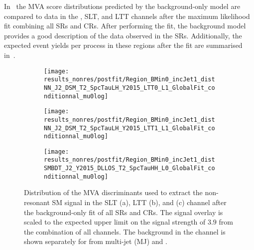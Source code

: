 In~ the MVA score distributions predicted by the
background-only model are compared to data in the \hadhad, \lephad SLT, and
\lephad LTT channels after the maximum likelihood fit combining all SRs and
CRs. After performing the fit, the background model provides a good description
of the data observed in the SRs. Additionally, the expected event yields per
process in these regions after the fit are summarised
in~.

\begin{figure}[htbp]
  \centering

  \begin{subfigure}{0.495\textwidth}
    \centering

    \texttt{[image: results\_nonres/postfit/Region\_BMin0\_incJet1\_distNN\_J2\_DSM\_T2\_SpcTauLH\_Y2015\_LTT0\_L1\_GlobalFit\_conditionnal\_mu0log]}

  \end{subfigure}\hfill%
  \begin{subfigure}{0.495\textwidth}
    \centering

    \texttt{[image: results\_nonres/postfit/Region\_BMin0\_incJet1\_distNN\_J2\_DSM\_T2\_SpcTauLH\_Y2015\_LTT1\_L1\_GlobalFit\_conditionnal\_mu0log]}

  \end{subfigure}

  \vspace{0.5em}

  \begin{subfigure}{0.495\textwidth}
    \centering

    \texttt{[image: results\_nonres/postfit/Region\_BMin0\_incJet1\_distSMBDT\_J2\_Y2015\_DLLOS\_T2\_SpcTauHH\_L0\_GlobalFit\_conditionnal\_mu0log]}

  \end{subfigure}

  \caption{Distribution of the MVA discriminants used to extract the
    non-resonant SM \HH signal in the \lephad SLT (a), \lephad LTT (b), and
    \hadhad (c) channel after the background-only fit of all SRs and CRs. The
    signal overlay is scaled to the expected upper limit on the signal strength
    of $3.9$ from the combination of all channels. The \faketauhadvis background
    in the \hadhad channel is shown separately for \faketauhadvis from multi-jet
    (MJ) and \ttbar.}%
  \label{fig:mvascores_postfit}
\end{figure}

